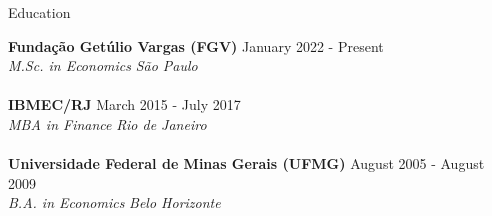 \documentclass{resume}
\begin{document}
  \begin{rSection}{Education}

    {\bf Fundação Getúlio Vargas (FGV)} \hfill { January 2022 - Present} \\ 
    {\em M.Sc. in Economics } \hfill {\em São Paulo} \\
    { } \\
    {\bf IBMEC/RJ} \hfill { March 2015 - July 2017} \\
    {\em MBA in Finance } \hfill {\em Rio de Janeiro} \\
    { } \\
    {\bf Universidade Federal de Minas Gerais (UFMG)}
    \hfill { August 2005 - August 2009} \\
    {\em B.A. in Economics } \hfill {\em Belo Horizonte} \\
  \end{rSection}
  
\end{document}
